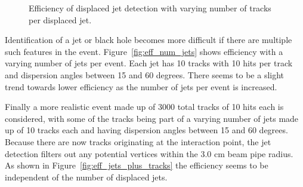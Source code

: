 \documentclass[preprint,sort&compress]{elsarticle}
\begin{document}
\begin{figure}[!Hhtb]
\begin{minipage}[t]{5.7cm}
\begin{center}
\caption{Efficiency of displaced jet detection with varying number of tracks per displaced jet.\label{fig:eff_num_tracks_per_singularity}}
\end{center}
\end{minipage}
\end{figure}

Identification of a jet or black hole becomes more difficult if there are multiple such features in the event.  Figure~\ref{fig:eff_num_jets} shows efficiency with a varying number of jets per event.  Each jet has 10 tracks with 10 hits per track and dispersion angles between 15 and 60 degrees.  There seems to be a slight trend towards lower efficiency as the number of jets per event is increased.

Finally a more realistic event made up of 3000 total tracks of 10 hits each is considered, with some of the tracks being part of a varying number of jets made up of 10 tracks each and having dispersion angles between 15 and 60 degrees.  Because there are now tracks originating at the interaction point, the jet detection filters out any potential vertices within the 3.0 cm beam pipe radius.  As shown in Figure~\ref{fig:eff_jets_plus_tracks} the efficiency seems to be independent of the number of displaced jets.
%
\end{document}
